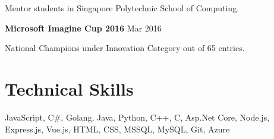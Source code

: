 \documentclass[11pt]{article} %
\begin{document}
Mentor students in Singapore Polytechnic School of Computing.

\bigskip

\textbf{Microsoft Imagine Cup 2016} \hfill Mar 2016

National Champions under Innovation Category out of 65 entries.




\section*{Technical Skills}
JavaScript, C\#, Golang, Java, Python, C++, C, Asp.Net Core, Node.js, Express.js, Vue.js, HTML, CSS, MSSQL, MySQL, Git, Azure
\end{document}

